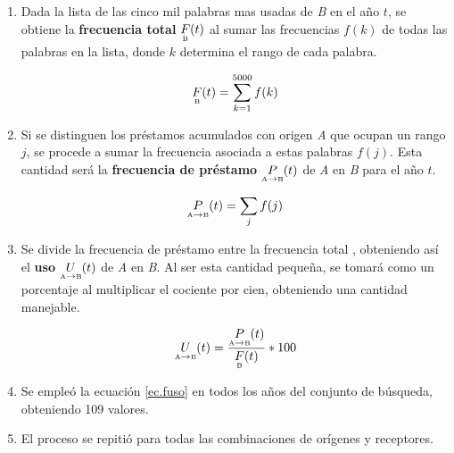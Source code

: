 \begin{enumerate}
	
	\item  Dada la lista de las cinco mil palabras mas usadas de \textit{B} en el año $t$, se obtiene la \textbf{frecuencia total} $\underset{\text{\tiny B}}{F}(t)$ al sumar las frecuencias $f(k)$ de todas las palabras en la lista, donde $k$ determina el rango  de cada palabra.
	
	\begin{equation}
	\label{ec.ftot}
	\underset{\text{\tiny B}}{F}(t) = \sum_{k=1}^{5000} f(k)
	\end{equation}
	
	
	
	\item Si se distinguen los préstamos acumulados con origen \textit{A}  que ocupan un rango $j$,  se procede a sumar la frecuencia asociada a estas palabras $f(j)$. Esta cantidad será la  \textbf{frecuencia de préstamo} $\underset{ \text{\tiny A} \to  \text{\tiny B} }{P}(t)$   de \textit{A} en \textit{B} para el año $t$.
	
	\begin{equation}
	\label{ec.fpres}
	\underset{ \text{\tiny A} \to  \text{\tiny B} }{P}(t) = \sum_{j} f(j)
	\end{equation}
	
	
	\item  Se divide la frecuencia de préstamo entre la frecuencia total , obteniendo así el \textbf{uso} $\underset{ \text{\tiny A} \to  \text{\tiny B} }{U}(t)$  de \textit{A} en \textit{B}.  Al ser esta cantidad pequeña, se tomará como un porcentaje al multiplicar el cociente por cien, obteniendo una cantidad manejable. 
	
	\begin{equation}
	\label{ec.fuso}
	\underset{ \text{\tiny A} \to  \text{\tiny B} }{U}(t) = \frac{	\underset{ \text{\tiny A} \to  \text{\tiny B} }{P}(t)}{\underset{\text{\tiny B}}{F}(t) } * 100
	\end{equation}
	
	
	
	\item Se empleó la ecuación \ref{ec.fuso} en todos los años del conjunto de búsqueda, obteniendo 109 valores.
	
	\item El proceso se repitió para todas las combinaciones de orígenes y receptores.
	
\end{enumerate}

